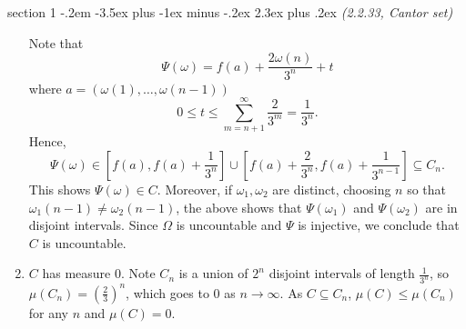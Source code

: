 \documentclass[12pt]{article}
\makeatletter
\theoremstyle{norm}
\newcommand{\rc}[1]{\frac{1}{#1}}
\newcommand{\subeq}[0]{\subseteq}
\newcommand{\om}[0]{\omega}
\newcommand{\Om}[0]{\Omega}
\newcommand{\ba}[1]{\left[ {#1} \right]}
\newcommand{\pa}[1]{\left( {#1} \right)}
\newcommand{\pf}[2]{\pa{\frac{#1}{#2}}}
\newenvironment{problem}{\@startsection
       {section}
       {1}
       {-.2em}
       {-3.5ex plus -1ex minus -.2ex}
       {2.3ex plus .2ex}
       {\pagebreak[3]%
       \large\bf\noindent{Problem }
       }
       }
       {%
       }
\makeatother
\begin{document}
\begin{problem}{\it(2.2.33, Cantor set)}
\begin{enumerate}
Note that
\[\Psi(\om)=f(a)+\frac{2\omega(n)}{3^n}+t\]
where $a=(\omega(1),\ldots, \omega(n-1))$
\[
0\leq t\leq \sum_{m=n+1}^{\infty} \frac{2}{3^m}=\rc{3^n}.\]
Hence,
\[
\Psi(\om)\in \ba{f(a),f(a)+\rc{3^n}}\cup \ba{f(a)+\frac{2}{3^n},f(a)+\rc{3^{n-1}}}\subeq C_n.
\]
This shows $\Psi(\om)\in C$. Moreover, if $\om_1,\om_2$ are distinct, choosing $n$ so that $\om_1(n-1)\neq \om_2(n-1)$, the above shows that $\Psi(\om_1)$ and $\Psi(\om_2)$ are in disjoint intervals.  Since $\Om$ is uncountable and $\Psi$ is injective, we conclude that $C$ is uncountable.
\item
$C$ has measure 0. Note $C_n$ is a union of $2^{n}$ disjoint intervals of length $\rc{3^n}$, so $\mu(C_n)=\pf 23^n$, which goes to 0 as $n\to \infty$. As $C\subeq C_n$, $\mu(C)\leq \mu(C_n)$ for any $n$ and $\mu(C)=0$.
\end{enumerate}
\end{problem}
\end{document}
